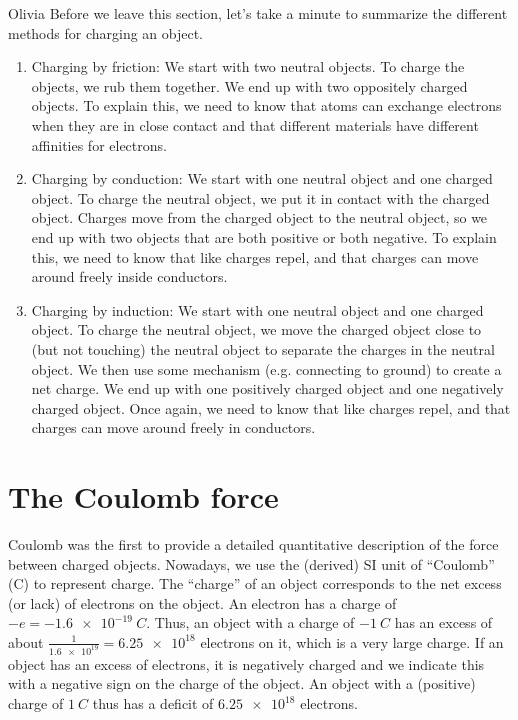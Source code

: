 \begin{studentOpinion}{Olivia}
Before we leave this section, let's take a minute to summarize the different methods for charging an object. 
\begin{enumerate}
\item Charging by friction: We start with two neutral objects. To charge the objects, we rub them together. We end up with two oppositely charged objects. To explain this, we need to know that atoms can exchange electrons when they are in close contact and that different materials have different affinities for electrons.

\item Charging by conduction: We start with one neutral object and one charged object. To charge the neutral object, we put it in contact with the charged object. Charges move from the charged object to the neutral object, so we end up with two objects that are both positive or both negative. To explain this, we need to know that like charges repel, and that charges can move around freely inside conductors. 

\item Charging by induction: We start with one neutral object and one charged object. To charge the neutral object, we move the charged object close to (but not touching) the neutral object to separate the charges in the neutral object. We then use some mechanism (e.g. connecting to ground) to create a net charge. We end up with one positively charged object and one negatively charged object. Once again, we need to know that like charges repel, and that charges can move around freely in conductors. 
\end{enumerate}


\end{studentOpinion}

\section{The Coulomb force}
Coulomb was the first to provide a detailed quantitative description of the force between charged objects. Nowadays, we use the (derived) SI unit of ``Coulomb'' (C) to represent charge. The ``charge'' of an object corresponds to the net excess (or lack) of electrons on the object. An electron has a charge of $-e=\SI{-1.6e-19}{C}$. Thus, an object with a charge of $\SI{-1}{C}$ has an excess of about $\frac{1}{\num{1.6e19}}=\num{6.25e18}$ electrons on it, which is a very large charge. If an object has an excess of electrons, it is negatively charged and we indicate this with a negative sign on the charge of the object. An object with a (positive) charge of $\SI{1}{C}$ thus has a deficit of $\num{6.25e18}$ electrons.

